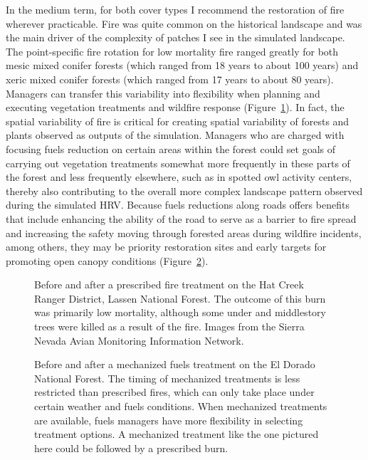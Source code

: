 In the medium term, for both cover types I recommend the restoration of fire wherever practicable. Fire was quite common on the historical landscape and was the main driver of the complexity of patches I see in the simulated landscape. The point-specific fire rotation for low mortality fire ranged greatly for both mesic mixed conifer forests (which ranged from 18 years to about 100 years) and xeric mixed conifer forests (which ranged from 17 years to about 80 years). Managers can transfer this variability into flexibility when planning and executing vegetation treatments and wildfire response (Figure~\ref{fig:pfire_comp_HCRD}). In fact, the spatial variability of fire is critical for creating spatial variability of forests and plants observed as outputs of the simulation. Managers who are charged with focusing fuels reduction on certain areas within the forest could set goals of carrying out vegetation treatments somewhat more frequently in these parts of the forest and less frequently elsewhere, such as in spotted owl activity centers, thereby also contributing to the overall more complex landscape pattern observed during the simulated HRV. Because fuels reductions along roads offers benefits that include enhancing the ability of the road to serve as a barrier to fire spread and increasing the safety moving through forested areas during wildfire incidents, among others, they may be priority restoration sites and early targets for promoting open canopy conditions (Figure~\ref{fig:pfire_comp_EDNF}). 

\begin{figure}[!htbp]
  \centering
  \caption{Before and after a prescribed fire treatment on the Hat Creek Ranger District, Lassen National Forest. The outcome of this burn was primarily low mortality, although some under and middlestory trees were killed as a result of the fire. Images from the Sierra Nevada Avian Monitoring Information Network.} 
  \label{fig:pfire_comp_HCRD}
\end{figure}

\begin{figure}[!htbp]
  \centering
  \caption{Before and after a mechanized fuels treatment on the El Dorado National Forest. The timing of mechanized treatments is less restricted than prescribed fires, which can only take place under certain weather and fuels conditions. When mechanized treatments are available, fuels managers have more flexibility in selecting treatment options. A mechanized treatment like the one pictured here could be followed by a prescribed burn.} 
  \label{fig:pfire_comp_EDNF}
\end{figure}


